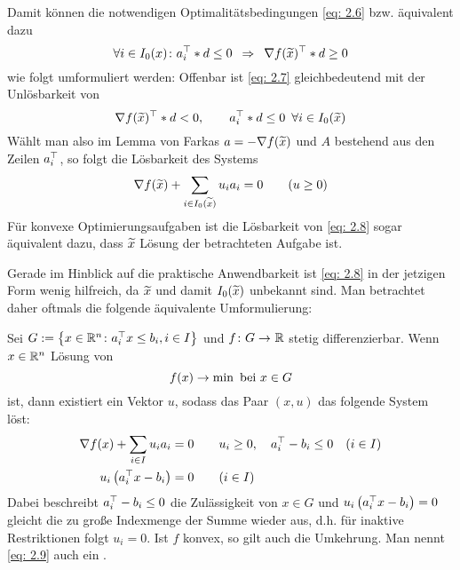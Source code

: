 Damit können die notwendigen Optimalitätsbedingungen \eqref{eq: 2.6} bzw. äquivalent dazu
\begin{equation}
	\forall i \in I_0(x) \colon a_i^{\top} * d \le 0 \enskip \Rightarrow \enskip \nabla f(\widetilde{x})^{\top} * d \ge 0 \label{eq: 2.7}
\end{equation}
wie folgt umformuliert werden: Offenbar ist \eqref{eq: 2.7} gleichbedeutend mit der Unlösbarkeit von 
\begin{equation*}
	\nabla f(\widetilde{x})^{\top} * d < 0, \qquad a_i^{\top} * d \le 0 \enskip \forall i \in I_0(\widetilde{x})
\end{equation*}
Wählt man also im Lemma von Farkas $a = - \nabla f(\widetilde{x})$ und $A$ bestehend aus den Zeilen $a_i^{\top}$, so folgt die Lösbarkeit des Systems
\begin{equation}
	\nabla f(\widetilde{x}) + \sum_{i \in I_0(\widetilde{x})} u_i a_i = 0 \qquad (u \ge 0) \label{eq: 2.8}
\end{equation}
Für konvexe Optimierungsaufgaben ist die Lösbarkeit von \eqref{eq: 2.8} sogar äquivalent dazu, dass $\widetilde{x}$ Lösung der betrachteten Aufgabe ist.

Gerade im Hinblick auf die praktische Anwendbarkeit ist \eqref{eq: 2.8} in der jetzigen Form wenig hilfreich, da $\widetilde{x}$ und damit $I_0(\widetilde{x})$ unbekannt sind. Man betrachtet daher oftmals die folgende äquivalente Umformulierung:

\begin{lemma} %
	Sei $G \mathrel{:=} \left\{ x \in \mathbb{R}^n \colon a_i^{\top}x \le b_i , i \in I \right\}$ und $\abb{f}{G}{\R}$ stetig differenzierbar. Wenn $x \in \mathbb{R}^n$ Lösung von
	\begin{equation*}
		f(x) \to \min \text{ bei } x \in  G
	\end{equation*}
	ist, dann existiert ein Vektor $u$, sodass das Paar $(x,u)$ das folgende System löst:
	\begin{align}
		\begin{split}
		\nabla f(x) + \sum_{i \in I} u_i a_i &= 0 \qquad u_i \ge 0 , \quad a_i^{\top} - b_i \le 0 \quad (i \in I) \\
		u_i \left( a_i^{\top}x - b_i \right) &= 0 \qquad (i \in I)
		\end{split} \label{eq: 2.9}
	\end{align}
	Dabei beschreibt $a_i^{\top} - b_i \le 0$ die Zulässigkeit von $x \in G$ und $u_i \left( a_i^{\top}x - b_i \right) = 0$ gleicht die zu große Indexmenge der Summe wieder aus, d.h. für inaktive Restriktionen folgt $u_i = 0$.
	Ist $f$ konvex, so gilt auch die Umkehrung. Man nennt \eqref{eq: 2.9} auch ein .
\end{lemma}

